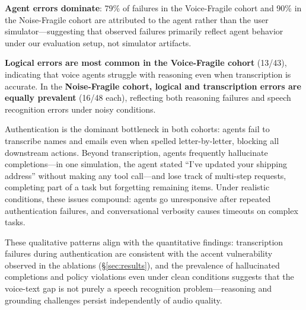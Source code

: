 \textbf{Agent errors dominate}: 79\% of failures in the Voice-Fragile cohort and 90\% in the Noise-Fragile cohort are attributed to the agent rather than the user simulator---suggesting that observed failures primarily reflect agent behavior under our evaluation setup, not simulator artifacts.

\textbf{Logical errors are most common in the Voice-Fragile cohort} (13/43), indicating that voice agents struggle with reasoning even when transcription is accurate. In the \textbf{Noise-Fragile cohort, logical and transcription errors are equally prevalent} (16/48 each), reflecting both reasoning failures and speech recognition errors under noisy conditions.

Authentication is the dominant bottleneck in both cohorts: agents fail to transcribe names and emails even when spelled letter-by-letter, blocking all downstream actions. Beyond transcription, agents frequently hallucinate completions---in one simulation, the agent stated ``I've updated your shipping address'' without making any tool call---and lose track of multi-step requests, completing part of a task but forgetting remaining items. Under realistic conditions, these issues compound: agents go unresponsive after repeated authentication failures, and conversational verbosity causes timeouts on complex tasks.

These qualitative patterns align with the quantitative findings: transcription failures during authentication are consistent with the accent vulnerability observed in the ablations (\S\ref{sec:results}), and the prevalence of hallucinated completions and policy violations even under clean conditions suggests that the voice-text gap is not purely a speech recognition problem---reasoning and grounding challenges persist independently of audio quality.
